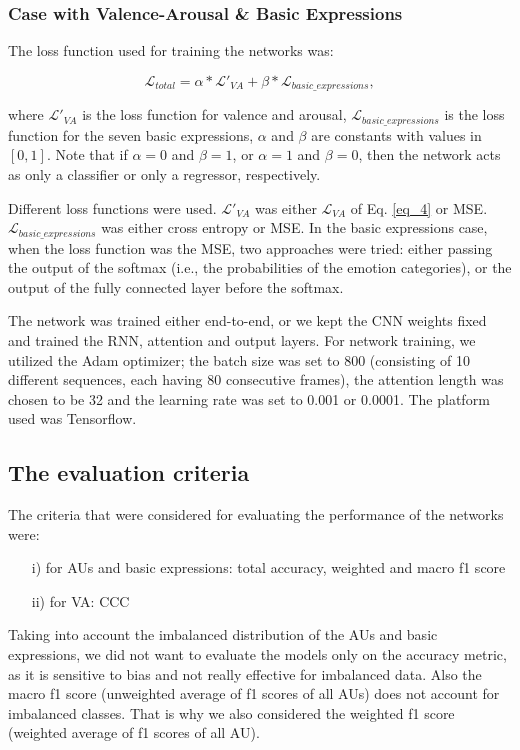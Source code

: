 \documentclass[a4paper, 10pt, conference]{ieeeconf}      %
\begin{document}
\subsubsection{Case with Valence-Arousal \& Basic Expressions}\label{loss_va_au}

The loss function used for training the networks was: 

\vskip -0.3cm

\begin{equation} \label{eq:1}
\mathcal{L}_{total} = \alpha * \mathcal{L'}_{VA} + \beta * \mathcal{L}_{basic\_expressions},
\end{equation}

\noindent
where $\mathcal{L'}_{VA}$ is the loss function for valence and arousal, $\mathcal{L}_{basic\_expressions}$ is the loss function for the seven basic expressions, $\alpha$ and $\beta$ are constants with values in $[0,1]$. Note that if $\alpha=0$ and $\beta=1$, or $\alpha=1$ and $\beta=0$, then the network acts as only a classifier or only a regressor, respectively.

Different loss functions were used. $\mathcal{L'}_{VA}$ was either $\mathcal{L}_{VA}$ of Eq. \ref{eq_4} or MSE. $\mathcal{L}_{basic\_expressions}$ was either cross entropy or MSE. In the basic expressions case, when the loss function was the MSE, two approaches were tried: either passing the output of the softmax (i.e., the probabilities of the emotion categories), or the output of the fully connected layer before the softmax.



The network was trained either end-to-end, or we kept the CNN weights fixed and trained the RNN, attention and output layers.
For network training, we utilized the Adam optimizer; the batch size was set to 800 (consisting of 10 different sequences, each having 80 consecutive frames), the attention length was chosen to be 32 and the learning rate was set to 0.001 or 0.0001.
The platform used was Tensorflow.






\subsection{The evaluation criteria}\label{criteria}


The criteria that were considered for evaluating the performance of the networks were:
\begin{itemize}
    \item[i)] for AUs and basic expressions: total accuracy, weighted and macro f1 score 
    \item[ii)] for VA: CCC
\end{itemize}
Taking into account the imbalanced distribution of the AUs and basic expressions, we did not want to evaluate the models only on the accuracy metric, as it is sensitive to bias and not really effective for imbalanced data. Also the macro f1 score (unweighted average of f1 scores of all AUs) does not account for imbalanced classes. That is why we also considered the weighted f1 score (weighted average of f1 scores of all AU).
\end{document}
